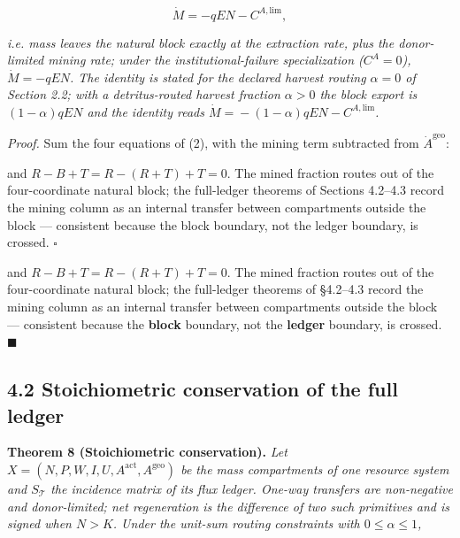\documentclass[11pt]{article}
\begin{document}
$$\dot M = -qEN - C^{A,\mathrm{lim}},$$

 \emph{i.e. mass leaves the natural block exactly at the extraction rate, plus the donor-limited mining rate; under the institutional-failure specialization (\(C^A = 0\)), \(\dot M = -qEN\). The identity is stated for the declared harvest routing \(\alpha = 0\) of Section 2.2; with a detritus-routed harvest fraction \(\alpha > 0\) the block export is \((1-\alpha)qEN\) and the identity reads \(\dot M =\allowbreak{} -(1-\alpha)qEN - C^{A,\allowbreak{}\mathrm{lim}}\).}

\emph{Proof.} Sum the four equations of (2), with the mining term subtracted from \(\dot A^{\mathrm{geo}}\): 

\par\noindent{}\par

 and \(R - B +\allowbreak{} T =\allowbreak{} R - (R +\allowbreak{} T) +\allowbreak{} T =\allowbreak{} 0\). The mined fraction routes out of the four-coordinate natural block; the full-ledger theorems of Sections 4.2--4.3 record the mining column as an internal transfer between compartments outside the block --- consistent because the block boundary, not the ledger boundary, is crossed. \(\square\)

and \(R-B+T=R-(R+T)+T=0\). The mined fraction routes out of the four-coordinate natural block; the full-ledger theorems of \S4.2--4.3 record the mining column as an internal transfer between compartments outside the block --- consistent because the \textbf{block} boundary, not the \textbf{ledger} boundary, is crossed. \(\blacksquare\)

\subsection*{4.2 Stoichiometric conservation of the full ledger}\label{42-stoichiometric-conservation-of-the-full-ledger}

\textbf{Theorem 8 (Stoichiometric conservation).} \emph{Let \(X =\allowbreak{} (N,\allowbreak{} P,\allowbreak{} W,\allowbreak{} I,\allowbreak{} U,\allowbreak{} A^{\mathrm{act}},\allowbreak{} A^{\mathrm{geo}})\) be the mass compartments of one resource system and \(S_{\mathcal{T}}\) the incidence matrix of its flux ledger. One-way transfers are non-negative and donor-limited; net regeneration is the difference of two such primitives and is signed when \(N > K\). Under the unit-sum routing constraints with \(0 \le \alpha \le 1\),} 
\end{document}
